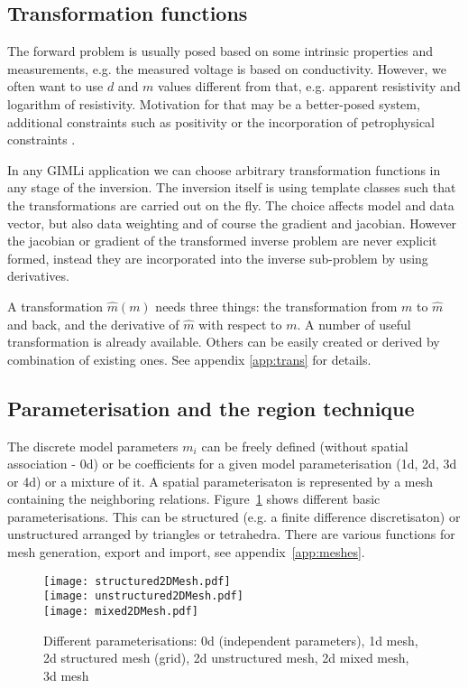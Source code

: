 \subsection{Transformation functions}\label{sec:introtrans}
The forward problem is usually posed based on some intrinsic properties and measurements, e.g. the measured voltage is based on  conductivity.
However, we often want to use $d$ and $m$ values different from that, e.g. apparent resistivity and logarithm of resistivity.
Motivation for that may be a better-posed system, additional constraints such as positivity or the incorporation of petrophysical constraints \citep{tarantola01,guerue08nearsurface}.

In any GIMLi application we can choose arbitrary transformation functions in any stage of the inversion.
The inversion itself is using template classes such that the transformations are carried out on the fly.
The choice affects model and data vector, but also data weighting and of course the gradient and jacobian.
However the jacobian or gradient of the transformed inverse problem are never explicit formed, instead they are incorporated into the inverse sub-problem by using derivatives.

A transformation $\hat m(m)$ needs three things: the transformation from $m$ to $\hat m$ and back, and the derivative of $\hat m$ with respect to $m$. A number of useful transformation is already available. Others can be easily created or derived by combination of existing ones. See appendix \ref{app:trans} for details.

\subsection{Parameterisation and the region technique}\label{sec:parameter}
The discrete model parameters $m_i$ can be freely defined (without spatial association - 0d) or be coefficients for a given model parameterisation (1d, 2d, 3d or 4d) or a mixture of it.
A spatial parameterisaton is represented by a mesh containing the neighboring relations.
Figure~\ref{fig:para} shows different basic parameterisations.
This can be structured (e.g. a finite difference discretisaton) or unstructured arranged by triangles or tetrahedra.
There are various functions for mesh generation, export and import, see appendix~\ref{app:meshes}.

\begin{figure}[htbp]
\centering\texttt{[image: structured2DMesh.pdf]}\\
\centering\texttt{[image: unstructured2DMesh.pdf]}\\
\centering\texttt{[image: mixed2DMesh.pdf]}
\caption{Different parameterisations: 0d (independent parameters), 1d mesh, 2d structured mesh (grid), 2d unstructured mesh, 2d mixed mesh, 3d mesh}\label{fig:para}
\end{figure}

